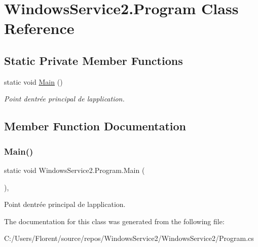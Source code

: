\hypertarget{class_windows_service2_1_1_program}{}\section{Windows\+Service2.\+Program Class Reference}
\label{class_windows_service2_1_1_program}
\subsection*{Static Private Member Functions}
\begin{DoxyCompactItemize}
\item 
static void \mbox{\hyperlink{class_windows_service2_1_1_program_a7652de7a373c3773e8c4692e68421f81}{Main}} ()
\begin{DoxyCompactList}\small\item\em Point d\textquotesingle{}entrée principal de l\textquotesingle{}application. \end{DoxyCompactList}\end{DoxyCompactItemize}


\subsection{Member Function Documentation}
\mbox{\label{class_windows_service2_1_1_program_a7652de7a373c3773e8c4692e68421f81}} 
\subsubsection{\texorpdfstring{Main()}{Main()}}
{\footnotesize\ttfamily static void Windows\+Service2.\+Program.\+Main (\begin{DoxyParamCaption}{ }\end{DoxyParamCaption})\hspace{0.3cm}{\ttfamily [static]}, {\ttfamily [private]}}



Point d\textquotesingle{}entrée principal de l\textquotesingle{}application. 



The documentation for this class was generated from the following file\+:\begin{DoxyCompactItemize}
\item 
C\+:/\+Users/\+Florent/source/repos/\+Windows\+Service2/\+Windows\+Service2/Program.\+cs\end{DoxyCompactItemize}
